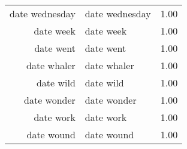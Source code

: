 \begin{table}[ht]
\begin{tabular}{rlr}
  date wednesday & date wednesday & 1.00 \\ 
  date week & date week & 1.00 \\ 
  date went & date went & 1.00 \\ 
  date whaler & date whaler & 1.00 \\ 
  date wild & date wild & 1.00 \\ 
  date wonder & date wonder & 1.00 \\ 
  date work & date work & 1.00 \\ 
  date wound & date wound & 1.00 \\ 
   \hline
\end{tabular}
\end{table}
